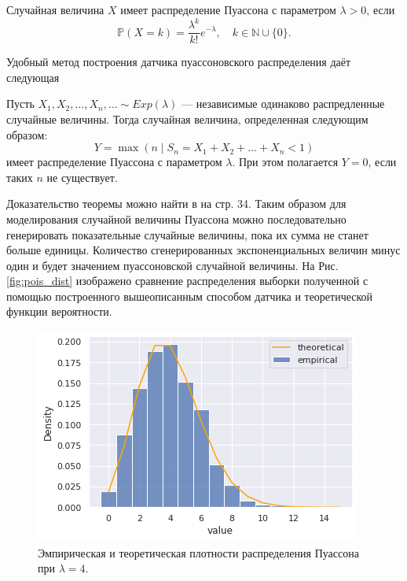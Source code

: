 \begin{definition}
	Случайная величина $X$ имеет распределение Пуассона с параметром $\lambda>0$,
	 если
	$$
	\mathbb{P}(X = k) = \frac{\lambda^k}{k!} e^{-\lambda}, \quad k \in \mathbb{N} 
	\cup \{0\}.
	$$
\end{definition}
Удобный метод построения датчика пуассоновского распределения даёт следующая 
\begin{theorem}
	Пусть $X_1,X_2,\ldots,X_n,\ldots\sim Exp(\lambda)$ --- независимые одинаково
	 распредленные случайные величины. Тогда случайная величина, определенная
	 следующим образом:
	$$
	Y = \max(n \mid S_n = X_1 + X_2 + \dots + X_n < 1)
	$$
	имеет распределение Пуассона с параметром $\lambda$. При этом полагается $Y=0$,
	 если таких $ n $ не существует.
\end{theorem}
Доказательство теоремы можно найти в \cite{model_randoms} на стр. 34. Таким образом
 для моделирования случайной величины Пуассона можно последовательно генерировать
 показательные случайные величины, пока их сумма не станет больше единицы. Количество
 сгенерированных экспоненциальных величин минус один и будет значением пуассоновской
 случайной величины. На Рис.\eqref{fig:pois_dist} изображено сравнение распределения
 выборки полученной с помощью построенного вышеописанным способом датчика и
 теоретической функции вероятности.

\begin{figure}[ht]
	\centering
	\includegraphics[width = 0.8\linewidth]{"./resources/pois_dist.png"}
	\caption{Эмпирическая и теоретическая плотности распределения Пуассона при
	 $ \lambda = 4 $.}
    \label{fig:pois_dist}
\end{figure}

